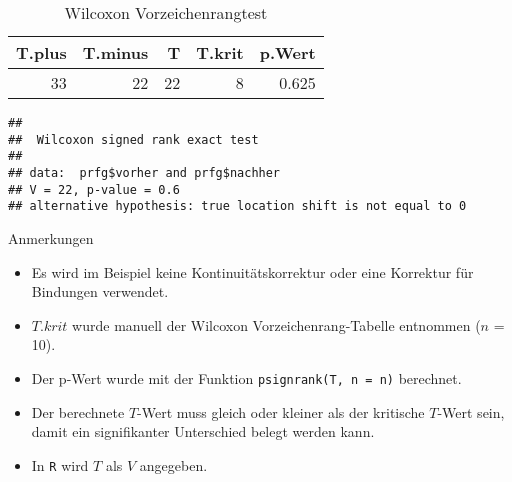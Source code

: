 \documentclass[
]{book}
\newenvironment{Shaded}{\begin{snugshade}}{\end{snugshade}}
\newcommand{\AttributeTok}[1]{\textcolor[rgb]{0.77,0.63,0.00}{#1}}
\newcommand{\ConstantTok}[1]{\textcolor[rgb]{0.00,0.00,0.00}{#1}}
\newcommand{\DocumentationTok}[1]{\textcolor[rgb]{0.56,0.35,0.01}{\textbf{\textit{#1}}}}
\newcommand{\FunctionTok}[1]{\textcolor[rgb]{0.00,0.00,0.00}{#1}}
\newcommand{\NormalTok}[1]{#1}
\newcommand{\SpecialCharTok}[1]{\textcolor[rgb]{0.00,0.00,0.00}{#1}}
\providecommand{\tightlist}{%
  \setlength{\itemsep}{0pt}\setlength{\parskip}{0pt}}
\begin{document}
\begin{table}

\caption{\label{tab:unnamed-chunk-31}Wilcoxon Vorzeichenrangtest}
\centering
\begin{tabular}[t]{r|r|r|r|r}
\hline
T.plus & T.minus & T & T.krit & p.Wert\\
\hline
33 & 22 & 22 & 8 & 0.625\\
\hline
\end{tabular}
\end{table}

\begin{Shaded}
\end{Shaded}

\begin{verbatim}
## 
##  Wilcoxon signed rank exact test
## 
## data:  prfg$vorher and prfg$nachher
## V = 22, p-value = 0.6
## alternative hypothesis: true location shift is not equal to 0
\end{verbatim}

Anmerkungen

\begin{itemize}
\tightlist
\item
  Es wird im Beispiel keine Kontinuitätskorrektur oder eine Korrektur für Bindungen verwendet.\\
\item
  \(T.krit\) wurde manuell der Wilcoxon Vorzeichenrang-Tabelle entnommen (\(n\) = 10).\\
\item
  Der p-Wert wurde mit der Funktion \texttt{psignrank(T,\ n\ =\ n)} berechnet.\\
\item
  Der berechnete \(T\)-Wert muss gleich oder kleiner als der kritische \(T\)-Wert sein, damit ein signifikanter Unterschied belegt werden kann.\\
\item
  In \texttt{R} wird \(T\) als \(V\) angegeben.
\end{itemize}
\end{document}
